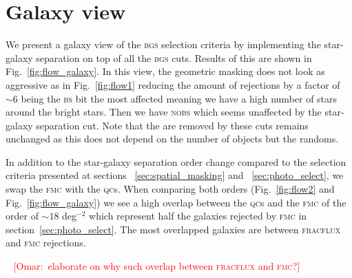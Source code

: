 \documentclass[fleqn,usenatbib]{mnras}
\newcommand{\omar}[1]{~\newline\noindent \textcolor{red}{{ [Omar:~{#1}]\\}}}
\newcommand{\BGS}{\textsc{bgs}\xspace}
\newcommand{\BS}{\textsc{bs}\xspace}
\newcommand{\FMC}{{\textsc{fmc}}\xspace}
\newcommand{\FRACFLUX}{{\textsc{fracflux}}\xspace}
\newcommand{\NOBS}{\textsc{nobs}\xspace}
\newcommand{\QCs}{\textsc{qc}s\xspace}
\begin{document}







\appendix
\section{Galaxy view}\label{app:galview}

We present a galaxy view of the \BGS selection criteria by implementing the star-galaxy separation on top of all the \BGS cuts. Results of this are shown in Fig.~\ref{fig:flow_galaxy}. In this view, the geometric masking does not look as aggressive as in Fig.~\ref{fig:flow1} reducing the amount of rejections by a factor of $\sim 6$ being the \BS bit the most affected meaning we have a high number of stars around the bright stars. Then we have \NOBS which seems unaffected by the star-galaxy separation cut. Note that the are removed by these cuts remains unchanged as this does not depend on the number of objects but the randoms.  

In addition to the star-galaxy separation order change compared to the selection criteria presented at sections ~\ref{sec:spatial_masking} and ~\ref{sec:photo_select}, we swap the \FMC with the \QCs. When comparing both orders (Fig.~\ref{fig:flow2} and Fig.~\ref{fig:flow_galaxy}) we see a high overlap between the \QCs and the \FMC of the order of $\sim 18$ deg$^{-2}$ which represent half the galaxies rejected by \FMC in section~\ref{sec:photo_select}. The most overlapped galaxies are between \FRACFLUX and \FMC rejections. 

\omar{elaborate on why such overlap between \FRACFLUX and \FMC ?}
\end{document}
